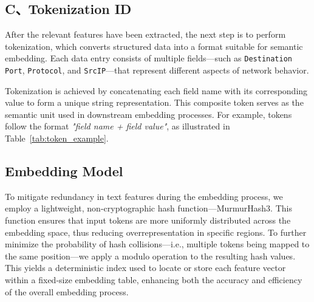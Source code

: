 \begin{ZhChapter}
\subsection*{C、Tokenization ID}
After the relevant features have been extracted, the next step is to perform tokenization, which converts structured data into a format suitable for semantic embedding. Each data entry consists of multiple fields—such as \texttt{Destination Port}, \texttt{Protocol}, and \texttt{SrcIP}—that represent different aspects of network behavior.

Tokenization is achieved by concatenating each field name with its corresponding value to form a unique string representation. This composite token serves as the semantic unit used in downstream embedding processes. For example, tokens follow the format \textit{"field name + field value"}, as illustrated in Table~\ref{tab:token_example}.

 
\begin{table}[htbp]
    \centering
    \caption{Example of Tokenized Input Fields} \label{tab:token_example}
    \end{table}
    


\subsection{Embedding Model}
To mitigate redundancy in text features during the embedding process, we employ a lightweight, non-cryptographic hash function—MurmurHash3. This function ensures that input tokens are more uniformly distributed across the embedding space, thus reducing overrepresentation in specific regions. To further minimize the probability of hash collisions—i.e., multiple tokens being mapped to the same position—we apply a modulo operation to the resulting hash values. This yields a deterministic index used to locate or store each feature vector within a fixed-size embedding table, enhancing both the accuracy and efficiency of the overall embedding process.


\end{ZhChapter}
